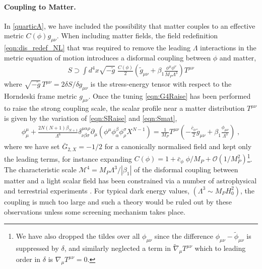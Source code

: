\documentclass[11pt]{article}
\newcommand{\con}{  \bar{c}_{\phi} }
\begin{document}
\paragraph{Coupling to Matter.}
In \eqref{quarticA}, we have included the possibility that matter couples to an effective metric $C(\phi) g_{\mu\nu}$. 
When including matter fields, the field redefinition \eqref{eqn:dis_redef_NL} that was required to remove the leading $\Lambda$ interactions in the metric equation of motion introduces a disformal coupling between $\phi$ and matter,
\begin{align}
 S \supset \int d^4 x \sqrt{-\tilde{g}}  \;  \frac{C (\phi)}{2} \left( \tilde{g}_{\mu\nu} + \beta_1  \frac{\phi^\mu \phi^\nu}{ M_P \Lambda^3}  \right) T^{\mu\nu}
 \label{eqn:Smat}
\end{align}
where $\sqrt{-\tilde{g}} \, T^{\mu\nu} = 2 \delta S / \delta g_{\mu\nu}$ is the stress-energy tensor with respect to the Horndeski frame metric $g_{\mu\nu}$. 
Once the tuning \eqref{eqn:G4Raise} has been performed to raise the strong coupling scale, the scalar profile near a matter distribution $T^{\mu\nu}$ is given by the variation of \eqref{eqn:SRaise} and \eqref{eqn:Smat},
\begin{align}
  \phi^\mu_\mu  +   \frac{ 2 N (N+1) \beta_{N+1} }{   \Lambda^{6} } \delta^{\mu \alpha \rho}_{\nu \beta \sigma}  \partial_\mu \left(  \phi^\mu \phi_\alpha^\beta \phi_\rho^\sigma  X^{N-1}   \right) = \frac{1}{M_P} T^{\mu\nu} \left( -  \frac{\con}{2} \tilde{g}_{\mu\nu}  +   \beta_1 \frac{ \phi_{\mu\nu} }{\Lambda^3}   \right)   \; , 
 \label{eqn:phi_eom_N}
\end{align}
where we have set $\bar{G}_{2,X} = -1/2$ for a canonically normalised field and kept only the leading terms, for instance expanding $C (\phi) = 1 + \con \; \phi/M_P + \mathcal{O} \left( 1/ M_P^2 \right)$\footnote{
We have also dropped the tildes over all $\phi_{\mu\nu}$ since the difference $\phi_{\mu\nu} - \tilde{\phi}_{\mu\nu}$ is suppressed by $\delta$, and similarly neglected a term in $\tilde{\nabla}_{\mu} T^{\mu\nu}$ which to leading order in $\delta$ is $\nabla_{\mu} T^{\mu\nu} = 0$. 
}.
The characteristic scale $\mathcal{M}^4 = M_P \Lambda^3/ |\beta_1|$ of the disformal coupling between matter and a light scalar field has been constrained via a number of astrophysical and terrestrial experiments \cite{Koivisto:2008ak, Zumalacarregui:2010wj, Koivisto:2012za, vandeBruck:2013yxa, Neveu:2014vua, Sakstein:2014isa, Sakstein:2014aca, Ip:2015qsa, Sakstein:2015jca, vandeBruck:2015ida, vandeBruck:2016cnh, Kaloper:2003yf, Brax:2014vva, Brax:2015hma, Brax:2012ie, vandeBruck:2012vq, Brax:2013nsa}.
For typical dark energy values, $(\Lambda^3 \sim M_P H_0^2)$, the coupling is much too large and such a theory would be ruled out by these observations unless some screening mechanism takes place.
\end{document}

